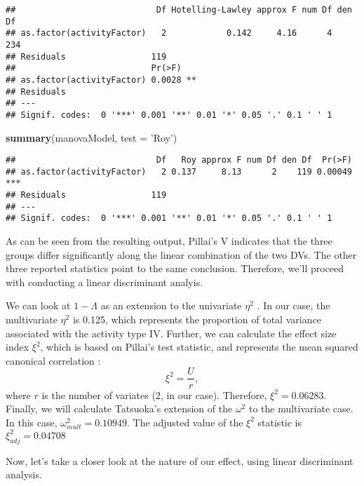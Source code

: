\documentclass[12pt,]{article}
\newenvironment{Shaded}{\begin{snugshade}}{\end{snugshade}}
\newcommand{\DataTypeTok}[1]{\textcolor[rgb]{0.13,0.29,0.53}{#1}}
\newcommand{\KeywordTok}[1]{\textcolor[rgb]{0.13,0.29,0.53}{\textbf{#1}}}
\newcommand{\NormalTok}[1]{#1}
\newcommand{\StringTok}[1]{\textcolor[rgb]{0.31,0.60,0.02}{#1}}
\begin{document}
\begin{verbatim}
##                            Df Hotelling-Lawley approx F num Df den Df
## as.factor(activityFactor)   2            0.142     4.16      4    234
## Residuals                 119                                        
##                           Pr(>F)   
## as.factor(activityFactor) 0.0028 **
## Residuals                          
## ---
## Signif. codes:  0 '***' 0.001 '**' 0.01 '*' 0.05 '.' 0.1 ' ' 1
\end{verbatim}

\begin{Shaded}
\begin{Highlighting}[]
\KeywordTok{summary}\NormalTok{(manovaModel, }\DataTypeTok{test =} \StringTok{'Roy'}\NormalTok{)}
\end{Highlighting}
\end{Shaded}

\begin{verbatim}
##                            Df   Roy approx F num Df den Df  Pr(>F)    
## as.factor(activityFactor)   2 0.137     8.13      2    119 0.00049 ***
## Residuals                 119                                         
## ---
## Signif. codes:  0 '***' 0.001 '**' 0.01 '*' 0.05 '.' 0.1 ' ' 1
\end{verbatim}

As can be seen from the resulting output, Pillai's V indicates that the
three groups differ significantly along the linear combination of the
two DVs. The other three reported statistics point to the same
conclusion. Therefore, we'll proceed with conducting a linear
discriminant analyis.

We can look at \(1 - \Lambda\) as an extension to the univariate
\(\eta^2\) \citep{huberty_applied_2006}. In our case, the multivariate
\(\eta^2\) is 0.125, which represents the proportion of total variance
associated with the activity type IV. Further, we can calculate the
effect size index \(\xi^2\), which is based on Pillai's test statistic,
and represents the mean squared canonical correlation
\citep{huberty_applied_2006}: \[\xi^2 = \frac{U}{r},\] where \(r\) is
the number of variates (2, in our case). Therefore, \(\xi^2 = 0.06283\).
Finally, we will calculate Tatsuoka's
\citep[1970; according to][]{huberty_applied_2006} extension of the
\(\omega^2\) to the multivariate case. In this case,
\(\omega^2_{mult} = 0.10949\). The adjusted value of the \(\xi^2\)
statistic is \(\xi^2_{adj} = 0.04708\)

Now, let's take a closer look at the nature of our effect, using linear
discriminant analysis.
\end{document}
